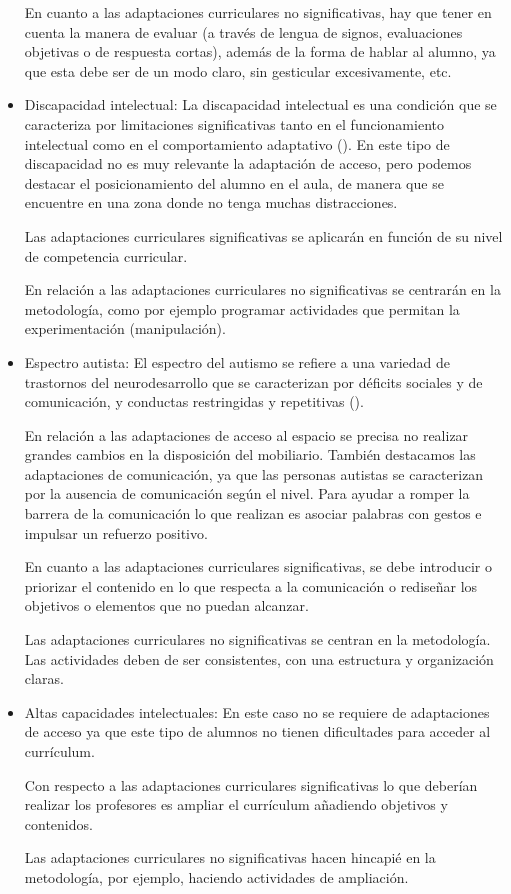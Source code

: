 \begin{itemize}
          En cuanto a las adaptaciones curriculares no significativas, hay que tener en cuenta la manera de evaluar (a través de lengua de signos, evaluaciones objetivas o de respuesta cortas), además de la forma de hablar al alumno, ya que esta debe ser de un modo claro, sin gesticular excesivamente, etc.

    \item Discapacidad intelectual: La discapacidad intelectual es una condición que se caracteriza por limitaciones significativas tanto en el funcionamiento intelectual como en el comportamiento adaptativo (\citeauthor{disIntelectual}).
          En este tipo de discapacidad no es muy relevante la adaptación de acceso, pero podemos destacar el posicionamiento del alumno en el aula, de manera que se encuentre en una zona donde no tenga muchas distracciones.

          Las adaptaciones curriculares significativas se aplicarán en función de su nivel de competencia curricular.

          En relación a las adaptaciones curriculares no significativas se centrarán en la metodología, como por ejemplo programar actividades que permitan la experimentación (manipulación).

    \item Espectro autista: El espectro del autismo se refiere a una variedad de trastornos del neurodesarrollo que se caracterizan por déficits sociales y de comunicación, y conductas restringidas y repetitivas (\citeauthor{espectroAutista}).

          En relación a las adaptaciones de acceso al espacio se precisa no realizar grandes cambios en la disposición del mobiliario. También destacamos las adaptaciones de comunicación, ya que las personas autistas se caracterizan por la ausencia de comunicación según el nivel. Para ayudar a romper la barrera de la comunicación lo que realizan es asociar palabras con gestos e impulsar un refuerzo positivo.

          En cuanto a las adaptaciones curriculares significativas, se debe introducir o priorizar el contenido en lo que respecta a la  comunicación o rediseñar los objetivos o elementos que no puedan alcanzar.

          Las adaptaciones curriculares no significativas se centran en la metodología. Las actividades deben de ser consistentes, con una estructura y organización claras.

    \item Altas capacidades intelectuales: En este caso no se requiere de adaptaciones de acceso ya que  este tipo de alumnos no tienen dificultades para acceder al currículum.

          Con respecto a las adaptaciones curriculares significativas lo que deberían realizar los profesores es ampliar el currículum añadiendo objetivos y contenidos.

          Las adaptaciones curriculares no significativas hacen hincapié en la metodología, por ejemplo, haciendo actividades de ampliación.

\end{itemize}
\nocite{adaptacionUNED}

